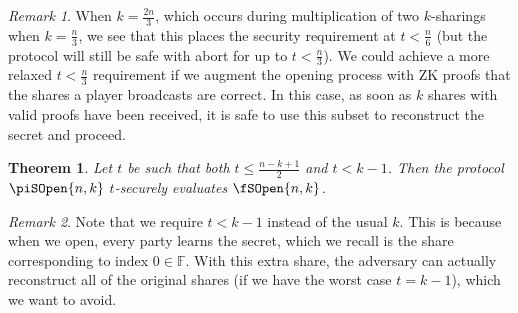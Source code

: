 \documentclass{article}
\newtheorem{theorem}{Theorem}
\theoremstyle{remark}
\newtheorem{remark}{Remark}
\newcommand{\F}{\mathbb{F}}
\begin{document}
\begin{remark}
	When $k = \frac{2n}{3}$, which occurs during multiplication of two
	$k$-sharings when $k = \frac{n}{3}$, we see that this places the security
	requirement at $t < \frac{n}{6}$ (but the protocol will still be safe with
	abort for up to $t < \frac{n}{3}$). We could achieve a more relaxed $t <
	\frac{n}{3}$ requirement if we augment the opening process with ZK proofs
	that the shares a player broadcasts are correct. In this case, as soon as
	$k$ shares with valid proofs have been received, it is safe to use this
	subset to reconstruct the secret and proceed.
\end{remark}

\begin{theorem}\label{thm:so}
	Let $t$ be such that both $t \le \frac{n - k + 1}{2}$ and $t < k - 1$. Then
	the protocol $\piSOpen{n,k}$ $t$-securely evaluates $\fSOpen{n,k}$.
\end{theorem}

\begin{remark}
	Note that we require $t < k - 1$ instead of the usual $k$. This is because
	when we open, every party learns the secret, which we recall is the share
	corresponding to index $0 \in \F$. With this extra share, the adversary can
	actually reconstruct all of the original shares (if we have the worst case
	$t = k - 1$), which we want to avoid.
\end{remark}
\end{document}
